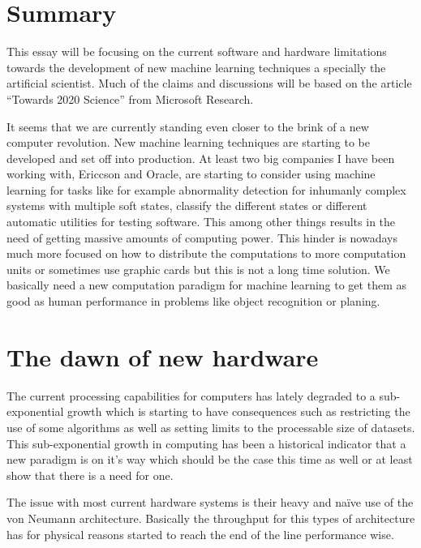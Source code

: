 \documentclass{article}
\begin{document}

\section{Summary}
    This essay will be focusing on the current software and hardware limitations
    towards the development of new machine learning techniques a specially the
    artificial scientist. Much of the claims and discussions will be based on
    the article ``Towards 2020 Science'' from Microsoft Research.\cite{ms2020}

    It seems that we are currently standing even closer to the brink of a new 
    computer revolution. New machine learning techniques are starting to be 
    developed and set off into production. At least two big companies I have been working
    with, Ericcson and Oracle, are starting to consider using machine learning
    for tasks like for example abnormality detection for inhumanly complex
    systems with multiple soft
    states, classify the different states or different automatic utilities for
    testing software. This among other things results in
    the need of getting massive amounts of computing power.
    This hinder is nowadays much more focused on how to 
    distribute the computations to more computation units or sometimes use
    graphic cards but this is not a long time solution. We basically need a new
    computation paradigm for machine learning to get them as good as human
    performance in problems like object recognition or planing.



\section{The dawn of new hardware}
    The current processing capabilities for computers has lately degraded to a
    sub-exponential growth which is starting to have consequences such as 
    restricting the use of some algorithms as well as setting limits 
    to the processable size of datasets.
    This sub-exponential growth in computing has been a historical indicator
    that a new paradigm is on it's way which should be the case this time as
    well or at least show that there is a need for one.%
    
    The issue with most current hardware systems is their heavy and na\"{i}ve use of the von
    Neumann architecture. Basically the throughput for this types of
    architecture
    has for physical reasons started to reach the end of the line 
    performance wise.
\end{document}
